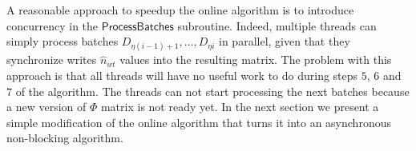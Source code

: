\documentclass[russian,english]{llncs}
\newcommand{\kw}[1]{\textsf{#1}}
\newcounter{wavenum}
\newcommand*{\clki}{
  \draw (t_cur) -- ++(0,.0) -- ++(.5,0) -- ++(0,-.0) -- ++(.5,0) -- ++(0,.0)
    node[time] (t_cur) {};
}
\newcommand*{\bitvector}[6]{
  \fill[fill=#3, pattern=#5, pattern color=#4,fill opacity=#6]
                         (t_cur) -- ++( .0, .2) -- ++(#2-.0,0) -- ++(.0, -.18)
                         -- ++(-.0,-.18) -- ++(.0-#2,0) -- cycle;
  \path (t_cur) -- node[anchor=mid] {#1} ++(#2,0) node[time] (t_cur) {};
}
\newcommand*{\Wait}[2]{
    \bitvector{#1}{#2}{white}{white}{}{0.0}
}
\newcommand*{\ProcBatchOne}[2][XXX]{
    \bitvector{#1}{#2}{orange}{orange}{}{1.0}
}
\newcommand*{\ProcBatchTwo}[2][XXX]{
    \bitvector{#1}{#2}{yellow}{yellow}{}{1.0}
}
\newcommand*{\Normalization}[2][XXX]{
    \bitvector{#1}{#2}{green}{green}{}{1.0}
}
\newcommand*{\Merge}[2][XXX]{
    \bitvector{#1}{#2}{blue}{blue}{}{1.0}
}
\newcommand{\nextwave}[1]{
  \path (0,\value{wavenum} * 0.5) node[left] {#1} node[time] (t_cur) {};
  \addtocounter{wavenum}{-1}
}
\newenvironment{wave}[3][\bf{time}]{
  \begin{tikzpicture}[draw=black, yscale=1.5,xscale=1.0]
    \tikzstyle{time}=[coordinate]
    \setlength{\unitlength}{1cm}
    \def\wavewidth{#3}
    \setcounter{wavenum}{0}
    \nextwave{#1}

    \draw[dotted] (t_cur) +(0,.1) node[above] {t=0\%} -- ++(0,2.8-#2);
    \clki
    \foreach \t in {1,...,\wavewidth}{
      \draw[dotted] (t_cur) +(0,.1) node[above] {\t0\%} -- ++(0,2.8-#2);
      \clki
    }
}{\end{tikzpicture}}
\begin{document}

A reasonable approach to speedup the online algorithm is to introduce concurrency in the $\kw{ProcessBatches}$ subroutine.
Indeed, multiple threads can simply process batches $D_{\eta (i - 1) + 1}, \dots, D_{\eta i}$ in parallel,
given that they synchronize writes $\hat n_{wt}$ values into the resulting matrix.
The problem with this approach is that all threads will have no useful work to do during steps $5$, $6$ and $7$ of the algorithm.
The threads can not start processing the next batches because a new version of $\Phi$ matrix is not ready yet.
In the next section we present a simple modification of the online algorithm that turns it into an asynchronous non-blocking algorithm.
\end{document}

